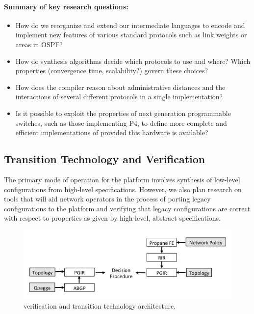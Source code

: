 \paragraph*{Summary of key research questions:}

\begin{itemize}
\item How do we reorganize and extend our intermediate languages to encode and
implement new features of various standard protocols such as link weights
or areas in OSPF?  
\item How do synthesis algorithms decide which protocols to use and where?
Which properties (convergence time, scalability?) govern these choices?
\item How does the compiler reason about administrative distances
and the interactions of several different protocols in a single
implementation?
\item Is it possible to exploit the properties of next generation
programmable switches, such as those implementing P4,
to define more complete and efficient implementations of \Propane
provided this hardware is available?
\end{itemize}

\subsection{Transition Technology and Verification}

The primary mode of operation for the \Propane platform involves
synthesis of low-level configurations from high-level specifications.
However, we also plan research on tools that will aid network operators 
in the process of porting legacy configurations to the \Propane platform
and verifying that legacy configurations are correct with respect to
properties as given by high-level, abstract \Propane specifications.

\begin{figure}
  \centering
  \includegraphics[width=.9\textwidth]{figures/transition-tech-arch}
\caption{\Propane verification and transition technology architecture.}
\label{fig:transition-tech}
\end{figure}

